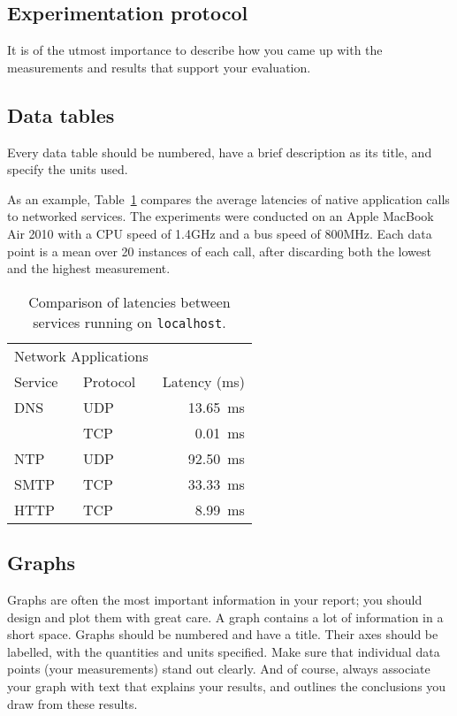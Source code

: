 \documentclass{scrartcl}
\begin{document}
\subsection{Experimentation protocol}

It is of the utmost importance to describe how you came up with the measurements and results that support your evaluation.

\subsection{Data tables}

Every data table should be numbered, have a brief description as its title, and specify the units used. 

As an example, Table~\ref{tab:my_label} compares the average latencies of native application calls to networked services. The experiments were conducted on an Apple MacBook Air 2010 with a CPU speed of 1.4GHz and a bus speed of 800MHz. Each data point is a mean over 20 instances of each call, after discarding both the lowest and the highest measurement.

\begin{table}[ht]
    \centering
    \begin{tabular}{llr}
\hline
\multicolumn{2}{c}{Network Applications} \\
\cline{1-2}
Service    & Protocol & Latency (\si{\ms}) \\
\hline
DNS         & UDP       & \SI{13.65}{\ms}      \\
            & TCP       & \SI{0.01}{\ms}       \\
NTP         & UDP       & \SI{92.50}{\ms}      \\
SMTP        & TCP       & \SI{33.33}{\ms}      \\
HTTP        & TCP       & \SI{8.99}{\ms}       \\
\hline
\end{tabular}
    \caption{Comparison of latencies between services running on \texttt{localhost}.}
    \label{tab:my_label}
\end{table}

\subsection{Graphs}

Graphs are often the most important information in your report; you should design and plot them with great care. A graph contains a lot of information in a short space. Graphs should be numbered and have a title. Their axes should be labelled, with the quantities and units specified. Make sure that individual data points (your measurements) stand out clearly. And of course, always associate your graph with text that explains your results, and outlines the conclusions you draw from these results.
\end{document}
